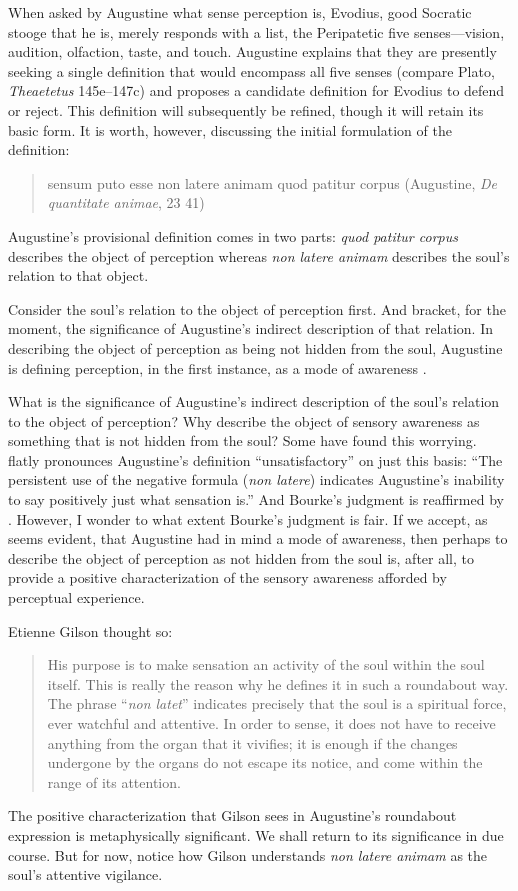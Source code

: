 \documentclass[12pt]{article}
\begin{document}
When asked by Augustine what sense perception is, Evodius, good Socratic stooge that he is, merely responds with a list, the Peripatetic five senses---vision, audition, olfaction, taste, and touch. Augustine explains that they are presently seeking a single definition that would encompass all five senses (compare Plato, \emph{Theaetetus} 145e--147c) and proposes a candidate definition for Evodius to defend or reject. This definition will subsequently be refined, though it will retain its basic form. It is worth, however, discussing the initial formulation of the definition: 
\begin{quote}
	sensum puto esse non latere animam quod patitur corpus (Augustine, \emph{De quantitate animae}, 23 41)
\end{quote}
Augustine's provisional definition comes in two parts: \emph{quod patitur corpus} describes the object of perception whereas \emph{non latere animam} describes the soul's relation to that object. 

Consider the soul's relation to the object of perception first. And bracket, for the moment, the significance of Augustine's indirect description of that relation. In describing the object of perception as being not hidden from the soul, Augustine is defining perception, in the first instance, as a mode of awareness \citep[275]{Brittain:2002hl}. 

What is the significance of Augustine's indirect description of the soul's relation to the object of perception? Why describe the object of sensory awareness as something that is not hidden from the soul? Some have found this worrying. \citet[112]{Bourke:1947jk} flatly pronounces Augustine's definition ``unsatisfactory'' on just this basis: ``The persistent use of the negative formula (\emph{non latere}) indicates Augustine's inability to say positively just what sensation is.'' And Bourke's judgment is reaffirmed by \citet[104, n. 1]{McMahon:1947dn}. However, I wonder to what extent Bourke's judgment is fair. If we accept, as seems evident, that Augustine had in mind a mode of awareness, then perhaps to describe the object of perception as not hidden from the soul is, after all, to provide a positive characterization of the sensory awareness afforded by perceptual experience.  

Etienne Gilson thought so:
\begin{quote}
	His purpose is to make sensation an activity of the soul within the soul itself. This is really the reason why he defines it in such a roundabout way. The phrase ``\emph{non latet}'' indicates precisely that the soul is a spiritual force, ever watchful and attentive. In order to sense, it does not have to receive anything from the organ that it vivifies; it is enough if the changes undergone by the organs do not escape its notice, and come within the range of its attention. \citep[63]{Gilson:1961ec}
\end{quote}
The positive characterization that Gilson sees in Augustine's roundabout expression is metaphysically significant. We shall return to its significance in due course. But for now, notice how Gilson understands \emph{non latere animam} as the soul's attentive vigilance. 
\end{document}
